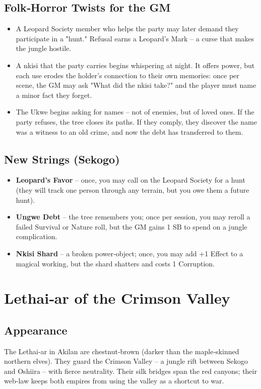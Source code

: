 \documentclass[11pt]{book}
\begin{document}
\subsection*{Folk‑Horror Twists for the GM}
\begin{itemize}
\item A Leopard Society member who helps the party may later demand they participate in a "hunt." Refusal earns a Leopard's Mark -- a curse that makes the jungle hostile.
\item A nkisi that the party carries begins whispering at night. It offers power, but each use erodes the holder's connection to their own memories: once per scene, the GM may ask "What did the nkisi take?" and the player must name a minor fact they forget.
\item The Ukwe begins asking for names -- not of enemies, but of loved ones. If the party refuses, the tree closes its paths. If they comply, they discover the name was a witness to an old crime, and now the debt has transferred to them.
\end{itemize}

\subsection*{New Strings (Sekogo)}
\begin{itemize}
\item \textbf{Leopard's Favor} -- once, you may call on the Leopard Society for a hunt (they will track one person through any terrain, but you owe them a future hunt).
\item \textbf{Ungwe Debt} -- the tree remembers you; once per session, you may reroll a failed Survival or Nature roll, but the GM gains 1 SB to spend on a jungle complication.
\item \textbf{Nkisi Shard} -- a broken power‑object; once, you may add +1 Effect to a magical working, but the shard shatters and costs 1 Corruption.
\end{itemize}

\section{Lethai‑ar of the Crimson Valley}

\subsection*{Appearance}
The Lethai‑ar in Akilan are chestnut‑brown (darker than the maple‑skinned northern elves). They guard the Crimson Valley -- a jungle rift between Sekogo and Oshiira -- with fierce neutrality. Their silk bridges span the red canyons; their web‑law keeps both empires from using the valley as a shortcut to war.
\end{document}
